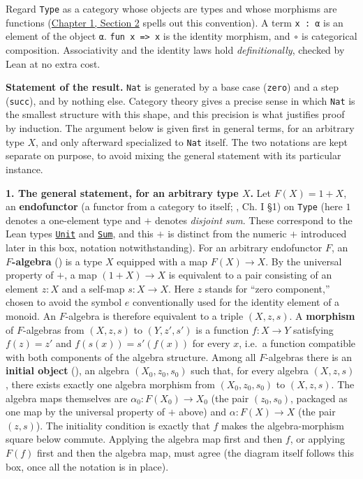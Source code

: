 \begin{mathreading}

Regard \texttt{Type} as a category whose objects are types and whose morphisms are functions (\hyperref[sec:01-basics:02-def-let-implicit:1]{Chapter 1, Section 2} spells out this convention). A term \texttt{x : α} is an element of the object \texttt{α}. \texttt{fun x => x} is the identity morphism, and \texttt{∘} is categorical composition. Associativity and the identity laws hold \emph{definitionally}, checked by Lean at no extra cost.

\textbf{Statement of the result.} \texttt{Nat} is generated by a base case (\texttt{zero}) and a step (\texttt{succ}), and by nothing else. Category theory gives a precise sense in which \texttt{Nat} is the smallest structure with this shape, and this precision is what justifies proof by induction. The argument below is given first in general terms, for an arbitrary type \(X\), and only afterward specialized to \texttt{Nat} itself. The two notations are kept separate on purpose, to avoid mixing the general statement with its particular instance.

\textbf{1. The general statement, for an arbitrary type \(X\).} Let \(F(X) = 1 + X\), an \textbf{endofunctor} (a functor from a category to itself; \cite{MacLane1998}, Ch. I §1) on \texttt{Type} (here \(1\) denotes a one-element type and \(+\) denotes \emph{disjoint sum}. These correspond to the Lean types \href{https://leanprover-community.github.io/mathlib4_docs/Init/Prelude.html\#Unit}{\texttt{Unit}} and \href{https://leanprover-community.github.io/mathlib4_docs/Init/Core.html\#Sum}{\texttt{Sum}}, and this \(+\) is distinct from the numeric \(+\) introduced later in this box, notation notwithstanding). For an arbitrary endofunctor \(F\), an \textbf{\(F\)-algebra} (\cite{Jacobs1999}) is a type \(X\) equipped with a map \(F(X) \to X\). By the universal property of \(+\), a map \((1 + X) \to X\) is equivalent to a pair consisting of an element \(z : X\) and a self-map \(s : X \to X\). Here \(z\) stands for ``zero component,'' chosen to avoid the symbol \(e\) conventionally used for the identity element of a monoid. An \(F\)-algebra is therefore equivalent to a triple \((X, z, s)\). A \textbf{morphism} of \(F\)-algebras from \((X, z, s)\) to \((Y, z', s')\) is a function \(f : X \to Y\) satisfying \(f(z) = z'\) and \(f(s(x)) = s'(f(x))\) for every \(x\), i.e.~a function compatible with both components of the algebra structure. Among all \(F\)-algebras there is an \textbf{initial object} (\cite{MacLane1998}), an algebra \((X_0, z_0, s_0)\) such that, for every algebra \((X, z, s)\), there exists exactly one algebra morphism from \((X_0, z_0, s_0)\) to \((X, z, s)\). The algebra maps themselves are \(\alpha_0 : F(X_0) \to X_0\) (the pair \((z_0, s_0)\), packaged as one map by the universal property of \(+\) above) and \(\alpha : F(X) \to X\) (the pair \((z, s)\)). The initiality condition is exactly that \(f\) makes the algebra-morphism square below commute. Applying the algebra map first and then \(f\), or applying \(F(f)\) first and then the algebra map, must agree (the diagram itself follows this box, once all the notation is in place).


\end{mathreading}

